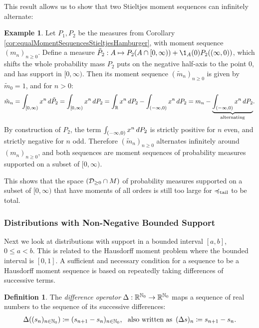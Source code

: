 \documentclass[a4paper]{scrreprt}
\newcommand{\M}{M}
\theoremstyle{definition}
\newtheorem{defn}[thm]{Definition} %
\newtheorem{ex}[thm]{Example} %
\begin{document}
    This result allows us to show that two Stieltjes moment sequences can infinitely alternate: 
    \begin{ex}
        Let $P_1, P_2$ be the measures from Corollary \ref{cor:equalMomentSequencesStieltjesHamburger}, with moment sequence $(m_n)_{n \geq 0}$.
        Define a measure $\tilde{P}_2: A \mapsto P_2(A \cap [0, \infty)) + \1_A(0) P_2((\infty, 0))$, which shifts the whole probability mass $P_2$ puts on the negative half-axis to the point $0$, and has support in $[0, \infty)$.
        Then its moment sequence $(\tilde{m}_n)_{n \geq 0}$ is given by $\tilde{m}_0 = 1$, and for $n > 0$:
        \begin{gather*}
            \tilde{m}_n 
            = \lintegral{[0, \infty)}{x^n}{\tilde{P}_2}
            = \lintegral{[0, \infty)}{x^n}{P_2}
            = \lintegral{\R}{x^n}{P_2} - \lintegral{(-\infty, 0)}{x^n}{P_2}
            = m_n - \undersetbrace{\lintegral{(-\infty, 0)}{x^n}{P_2}}{\text{alternating}}.
        \end{gather*}
        By construction of $P_2$, the term $\lintegral{(-\infty, 0)}{x^n}{P_2}$ is strictly positive for $n$ even, and strictly negative for $n$ odd.
        Therefore $(\tilde{m}_n)_{n \geq 0}$ alternates infinitely around $(m_n)_{n \geq 0}$,
        and both sequences are moment sequences of probability measures supported on a subset of $[0, \infty)$.
    \end{ex}

    This shows that the space $(\Dgeqzero \cap \M)$ of probability measures supported on a subset of $[0, \infty)$ that have moments of all orders is still too large for $\leqtail$ to be total.
    
    \subsubsection{Distributions with Non-Negative Bounded Support}
    Next we look at distributions with support in a bounded interval $[a, b]$, $0 \leq a < b$.
    This is related to the Hausdorff moment problem where the bounded interval is $[0, 1]$.
    A sufficient and necessary condition for a sequence to be a Hausdorff moment sequence is based on repeatedly taking differences of successive terms.
    \begin{defn}
        The \emph{difference operator} $\Delta: \R^{\N_0} \to \R^{\N_0}$ maps a sequence of real numbers to the sequence of its successive differences:
        \begin{gather*} 
            \Delta((s_n)_{n \in \N_0}) \coloneqq (s_{n+1} - s_n)_{n \in \N_0}, ~ \text{ also written as }\,
            (\Delta s)_n \coloneqq s_{n+1} - s_n.
        \end{gather*} 
    \end{defn}
\end{document}
